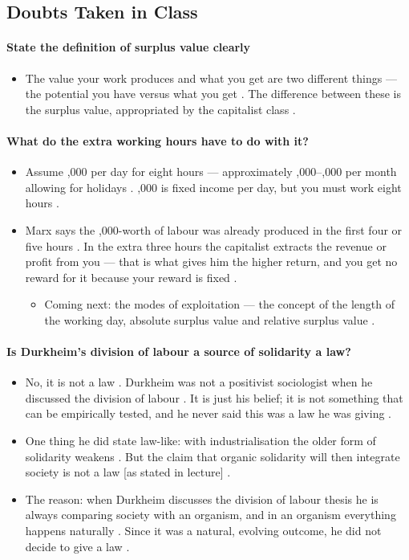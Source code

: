 \subsection{Doubts Taken in Class}

\paragraph{State the definition of surplus value clearly}
\begin{itemize}
    \item The value your work produces and what you get are two different things --- the potential you have versus what you get . The difference between these is the surplus value, appropriated by the capitalist class .
\end{itemize}

\paragraph{What do the extra working hours have to do with it?}
\begin{itemize}
    \item Assume ,000 per day for eight hours --- approximately ,000--,000 per month allowing for holidays . ,000 is fixed income per day, but you must work eight hours .
    \item Marx says the ,000-worth of labour was already produced in the first four or five hours . In the extra three hours the capitalist extracts the revenue or profit from you --- that is what gives him the higher return, and you get no reward for it because your reward is fixed .
    \begin{itemize}
        \item Coming next: the modes of exploitation --- the concept of the length of the working day, absolute surplus value and relative surplus value .
    \end{itemize}
\end{itemize}

\paragraph{Is Durkheim's division of labour a source of solidarity a law?}
\begin{itemize}
    \item No, it is not a law . Durkheim was not a positivist sociologist when he discussed the division of labour . It is just his belief; it is not something that can be empirically tested, and he never said this was a law he was giving .
    \item One thing he did state law-like: with industrialisation the older form of solidarity weakens . But the claim that organic solidarity will then integrate society is not a law [as stated in lecture] .
    \item The reason: when Durkheim discusses the division of labour thesis he is always comparing society with an organism, and in an organism everything happens naturally . Since it was a natural, evolving outcome, he did not decide to give a law .
\end{itemize}

